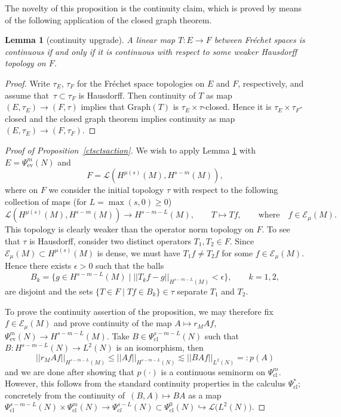 \documentclass[10pt,a4paper]{amsart}
\numberwithin{equation}{section}
\newtheorem{Lemma}[Theorem]{Lemma}
\theoremstyle{definition}
\newcommand{\1}{{\bf 1}}
\begin{document}
The novelty of this proposition is the continuity claim, which is proved by means of the following application of the closed graph theorem.

\begin{Lemma}[continuity upgrade]\label{upgrade}
A linear map $T\colon E\to F$ between Fr{\'e}chet spaces is continuous if and only if it is continuous with respect to some weaker Hausdorff topology on $F$.
\end{Lemma}

\begin{proof}
	Write $\tau_E$, $\tau_F$ for the Fr{\'e}chet space topologies on $E$ and $F$, respectively, and assume that~${\tau\subset \tau_F}$ is Hausdorff. Then continuity of $T$ as map $(E,\tau_E)\to (F,\tau)$ implies that $\mathrm{Graph}(T)$ is $\tau_E\times \tau$-closed. Hence it is $\tau_E\times \tau_F$-closed and the closed graph theorem implies continuity as map $(E,\tau_E)\to (F,\tau_F)$.
\end{proof}


\begin{proof}[Proof of Proposition~\ref{ctsctsaction}]
We wish to apply Lemma \ref{upgrade} with $E=\Psi_\mathrm{ev}^m(N)$ and
\[
F=\mathcal L(H^{\mu(s)}(M),H^{s-m}(M)),
\]
 where on $F$ we consider the initial topology $\tau$ with respect to the following collection of maps (for $L=\max(s,0)\ge 0$)
\[
	\mathcal L(H^{\mu(s)}(M),H^{s-m}(M)) \to H^{s-m-L}(M),\qquad T\mapsto Tf,\qquad \text{where}\quad f\in \mathcal E_\mu(M).\]
This topology is clearly weaker than the operator norm topology on $F$. To see that $\tau$ is Hausdorff, consider two distinct operators $T_1,T_2\in F$. Since $\mathcal E_\mu(M)\subset H^{\mu(s)}(M)$ is dense, we must have $T_1 f \neq T_2 f$ for some $f\in \mathcal E_\mu(M)$. Hence there exists $\epsilon>0$ such that the balls
\[
B_k=\bigl\{g\in H^{s-m-L}(M)\mid ||T_k f - g||_{H^{s-m-L}(M)}<\epsilon\bigr\},\qquad k=1,2,
\]
 are disjoint and the sets $\{T\in F\mid Tf\in B_k\} \in \tau$ separate $T_1$ and $T_2$.

To prove the continuity assertion of the proposition, we may therefore fix $f\in \mathcal E_\mu(M)$ and prove continuity of the map $ A\mapsto r_M Af$, $ \Psi^m_\mathrm{ev}(N) \to H^{s-m-L}(M)$. Take $B\in \Psi_\mathrm{cl}^{s-m-L}(N)$ such that $B\colon H^{s-m-L}(N)\to L^2(N)$ is an isomorphism, then
\[
	||r_MA f||_{H^{s-m-L}(M)}\le ||A f||_{H^{s-m-L}(N)} \lesssim ||BAf||_{L^2(N)}=:p(A)
\]
and we are done after showing that $p(\cdot)$ is a continuous seminorm on $\Psi^m_{\mathrm{cl}}$. However, this follows from the standard continuity properties in the calculus $\Psi_{\mathrm{cl}}^*$; concretely from the continuity of~${(B,A)\mapsto BA}$ as a map $\Psi^{s-m-L}_\mathrm{cl}(N)\times \Psi^{m}_\mathrm{cl}(N) \to \Psi_{\mathrm cl}^{s-L}(N) \subset \Psi^0_{\mathrm{cl}}(N) \hookrightarrow \mathcal L\bigl(L^2(N)\bigr)$.
\end{proof}
\end{document}

